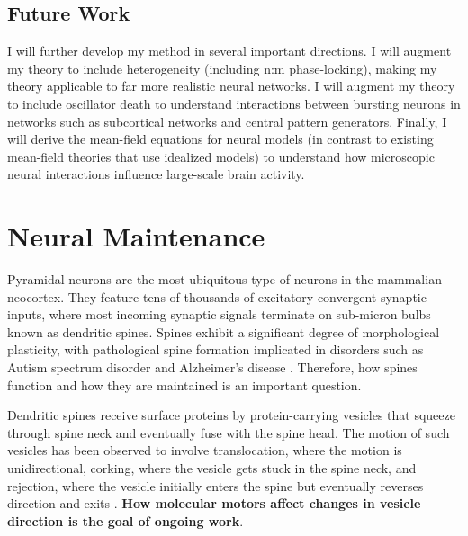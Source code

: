 \documentclass[a4paper,11pt]{article}
\begin{document}
	\subsection{Future Work}
	I will further develop my method in several important directions. I will augment my theory to include heterogeneity (including n:m phase-locking), making my theory applicable to far more realistic neural networks. I will augment my theory to include oscillator death to understand interactions between bursting neurons in networks such as subcortical networks and central pattern generators. Finally, I will derive the mean-field equations for neural models (in contrast to existing mean-field theories that use idealized models) to understand how microscopic neural interactions influence large-scale brain activity.
	
	
	\section{Neural Maintenance} \label{sec:maintenance}
	
	Pyramidal neurons are the most ubiquitous type of neurons in the mammalian neocortex. They feature tens of thousands of excitatory convergent synaptic inputs, where most incoming synaptic signals terminate on sub-micron bulbs known as dendritic spines. Spines exhibit a significant degree of morphological plasticity, with pathological spine formation implicated in disorders such as Autism spectrum disorder and Alzheimer's disease \cite{penzes2011dendritic}. Therefore, how spines function and how they are maintained is an important question.
	
	Dendritic spines receive surface proteins by protein-carrying vesicles that squeeze through spine neck and eventually fuse with the spine head. The motion of such vesicles has been observed to involve translocation, where the motion is unidirectional, corking, where the vesicle gets stuck in the spine neck, and rejection, where the vesicle initially enters the spine but eventually reverses direction and exits \cite{park2006plasticity}. \textbf{How molecular motors affect changes in vesicle direction is the goal of ongoing work}.
	
\end{document}
